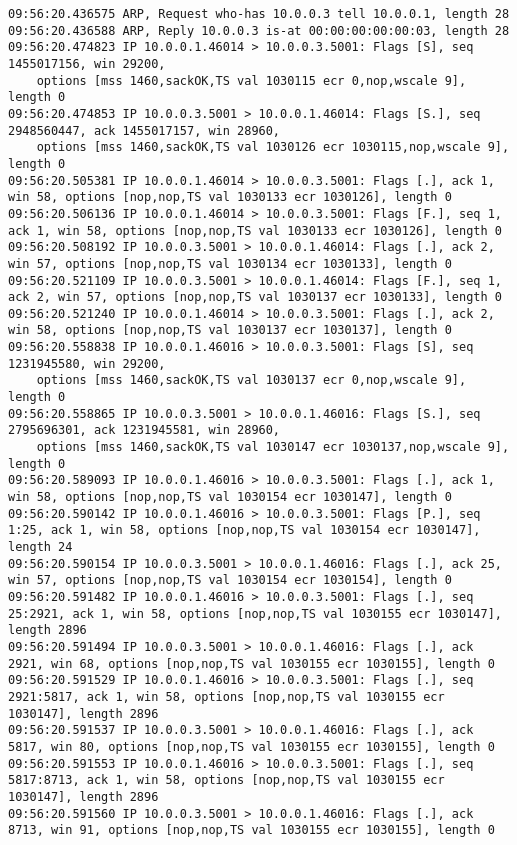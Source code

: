 \documentclass[12pt,letterpaper]{article}
\begin{document}
\begin{tiny}
\begin{verbatim}
09:56:20.436575 ARP, Request who-has 10.0.0.3 tell 10.0.0.1, length 28
09:56:20.436588 ARP, Reply 10.0.0.3 is-at 00:00:00:00:00:03, length 28
09:56:20.474823 IP 10.0.0.1.46014 > 10.0.0.3.5001: Flags [S], seq 1455017156, win 29200,
    options [mss 1460,sackOK,TS val 1030115 ecr 0,nop,wscale 9], length 0
09:56:20.474853 IP 10.0.0.3.5001 > 10.0.0.1.46014: Flags [S.], seq 2948560447, ack 1455017157, win 28960,
    options [mss 1460,sackOK,TS val 1030126 ecr 1030115,nop,wscale 9], length 0
09:56:20.505381 IP 10.0.0.1.46014 > 10.0.0.3.5001: Flags [.], ack 1, win 58, options [nop,nop,TS val 1030133 ecr 1030126], length 0
09:56:20.506136 IP 10.0.0.1.46014 > 10.0.0.3.5001: Flags [F.], seq 1, ack 1, win 58, options [nop,nop,TS val 1030133 ecr 1030126], length 0
09:56:20.508192 IP 10.0.0.3.5001 > 10.0.0.1.46014: Flags [.], ack 2, win 57, options [nop,nop,TS val 1030134 ecr 1030133], length 0
09:56:20.521109 IP 10.0.0.3.5001 > 10.0.0.1.46014: Flags [F.], seq 1, ack 2, win 57, options [nop,nop,TS val 1030137 ecr 1030133], length 0
09:56:20.521240 IP 10.0.0.1.46014 > 10.0.0.3.5001: Flags [.], ack 2, win 58, options [nop,nop,TS val 1030137 ecr 1030137], length 0
09:56:20.558838 IP 10.0.0.1.46016 > 10.0.0.3.5001: Flags [S], seq 1231945580, win 29200,
    options [mss 1460,sackOK,TS val 1030137 ecr 0,nop,wscale 9], length 0
09:56:20.558865 IP 10.0.0.3.5001 > 10.0.0.1.46016: Flags [S.], seq 2795696301, ack 1231945581, win 28960,
    options [mss 1460,sackOK,TS val 1030147 ecr 1030137,nop,wscale 9], length 0
09:56:20.589093 IP 10.0.0.1.46016 > 10.0.0.3.5001: Flags [.], ack 1, win 58, options [nop,nop,TS val 1030154 ecr 1030147], length 0
09:56:20.590142 IP 10.0.0.1.46016 > 10.0.0.3.5001: Flags [P.], seq 1:25, ack 1, win 58, options [nop,nop,TS val 1030154 ecr 1030147], length 24
09:56:20.590154 IP 10.0.0.3.5001 > 10.0.0.1.46016: Flags [.], ack 25, win 57, options [nop,nop,TS val 1030154 ecr 1030154], length 0
09:56:20.591482 IP 10.0.0.1.46016 > 10.0.0.3.5001: Flags [.], seq 25:2921, ack 1, win 58, options [nop,nop,TS val 1030155 ecr 1030147], length 2896
09:56:20.591494 IP 10.0.0.3.5001 > 10.0.0.1.46016: Flags [.], ack 2921, win 68, options [nop,nop,TS val 1030155 ecr 1030155], length 0
09:56:20.591529 IP 10.0.0.1.46016 > 10.0.0.3.5001: Flags [.], seq 2921:5817, ack 1, win 58, options [nop,nop,TS val 1030155 ecr 1030147], length 2896
09:56:20.591537 IP 10.0.0.3.5001 > 10.0.0.1.46016: Flags [.], ack 5817, win 80, options [nop,nop,TS val 1030155 ecr 1030155], length 0
09:56:20.591553 IP 10.0.0.1.46016 > 10.0.0.3.5001: Flags [.], seq 5817:8713, ack 1, win 58, options [nop,nop,TS val 1030155 ecr 1030147], length 2896
09:56:20.591560 IP 10.0.0.3.5001 > 10.0.0.1.46016: Flags [.], ack 8713, win 91, options [nop,nop,TS val 1030155 ecr 1030155], length 0
\end{verbatim}
\end{tiny}
\end{document}
